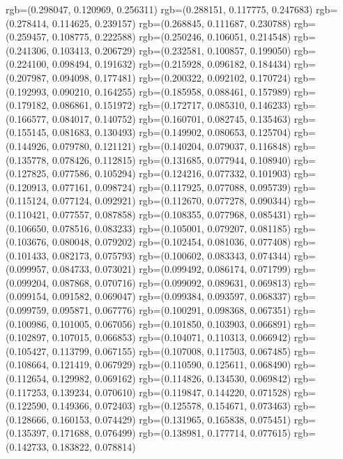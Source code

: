 {{{					rgb=(0.298047, 0.120969, 0.256311)
					rgb=(0.288151, 0.117775, 0.247683)
					rgb=(0.278414, 0.114625, 0.239157)
					rgb=(0.268845, 0.111687, 0.230788)
					rgb=(0.259457, 0.108775, 0.222588)
					rgb=(0.250246, 0.106051, 0.214548)
					rgb=(0.241306, 0.103413, 0.206729)
					rgb=(0.232581, 0.100857, 0.199050)
					rgb=(0.224100, 0.098494, 0.191632)
					rgb=(0.215928, 0.096182, 0.184434)
					rgb=(0.207987, 0.094098, 0.177481)
					rgb=(0.200322, 0.092102, 0.170724)
					rgb=(0.192993, 0.090210, 0.164255)
					rgb=(0.185958, 0.088461, 0.157989)
					rgb=(0.179182, 0.086861, 0.151972)
					rgb=(0.172717, 0.085310, 0.146233)
					rgb=(0.166577, 0.084017, 0.140752)
					rgb=(0.160701, 0.082745, 0.135463)
					rgb=(0.155145, 0.081683, 0.130493)
					rgb=(0.149902, 0.080653, 0.125704)
					rgb=(0.144926, 0.079780, 0.121121)
					rgb=(0.140204, 0.079037, 0.116848)
					rgb=(0.135778, 0.078426, 0.112815)
					rgb=(0.131685, 0.077944, 0.108940)
					rgb=(0.127825, 0.077586, 0.105294)
					rgb=(0.124216, 0.077332, 0.101903)
					rgb=(0.120913, 0.077161, 0.098724)
					rgb=(0.117925, 0.077088, 0.095739)
					rgb=(0.115124, 0.077124, 0.092921)
					rgb=(0.112670, 0.077278, 0.090344)
					rgb=(0.110421, 0.077557, 0.087858)
					rgb=(0.108355, 0.077968, 0.085431)
					rgb=(0.106650, 0.078516, 0.083233)
					rgb=(0.105001, 0.079207, 0.081185)
					rgb=(0.103676, 0.080048, 0.079202)
					rgb=(0.102454, 0.081036, 0.077408)
					rgb=(0.101433, 0.082173, 0.075793)
					rgb=(0.100602, 0.083343, 0.074344)
					rgb=(0.099957, 0.084733, 0.073021)
					rgb=(0.099492, 0.086174, 0.071799)
					rgb=(0.099204, 0.087868, 0.070716)
					rgb=(0.099092, 0.089631, 0.069813)
					rgb=(0.099154, 0.091582, 0.069047)
					rgb=(0.099384, 0.093597, 0.068337)
					rgb=(0.099759, 0.095871, 0.067776)
					rgb=(0.100291, 0.098368, 0.067351)
					rgb=(0.100986, 0.101005, 0.067056)
					rgb=(0.101850, 0.103903, 0.066891)
					rgb=(0.102897, 0.107015, 0.066853)
					rgb=(0.104071, 0.110313, 0.066942)
					rgb=(0.105427, 0.113799, 0.067155)
					rgb=(0.107008, 0.117503, 0.067485)
					rgb=(0.108664, 0.121419, 0.067929)
					rgb=(0.110590, 0.125611, 0.068490)
					rgb=(0.112654, 0.129982, 0.069162)
					rgb=(0.114826, 0.134530, 0.069842)
					rgb=(0.117253, 0.139234, 0.070610)
					rgb=(0.119847, 0.144220, 0.071528)
					rgb=(0.122590, 0.149366, 0.072403)
					rgb=(0.125578, 0.154671, 0.073463)
					rgb=(0.128666, 0.160153, 0.074429)
					rgb=(0.131965, 0.165838, 0.075451)
					rgb=(0.135397, 0.171688, 0.076499)
					rgb=(0.138981, 0.177714, 0.077615)
					rgb=(0.142733, 0.183822, 0.078814)
}}}
